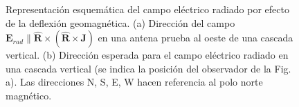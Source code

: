 \documentclass[11 pt, a4paper]{article} %
\numberwithin{equation}{section}
\numberwithin{figure}{section}
\numberwithin{table}{section}
\newcommand{\vect}[1]{\boldsymbol{\mathbf{#1}}}
\begin{document}
\begin{figure}[H]
	\centering
	\hspace{10mm}
	\caption{Representación esquemática del campo eléctrico radiado por efecto de la deflexión geomagnética. (a) Dirección del campo $\vect{E}_{rad}\parallel  \hat{\vect{R}}\times\left(\hat{\vect{R}}\times\vect{J}\right)$ en una antena prueba al oeste de una cascada vertical. (b) Dirección esperada para el campo eléctrico radiado en una cascada vertical (se indica la posición del observador de la Fig. a). Las direcciones N, S, E, W hacen referencia al polo norte magnético.}
	\label{Geomag_deflexion}
\end{figure}
\end{document}
